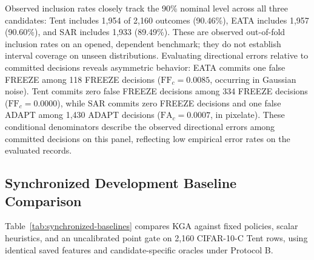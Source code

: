 Observed inclusion rates closely track the 90\% nominal level across all three candidates:
Tent includes 1,954 of 2,160 outcomes (90.46\%), EATA includes 1,957 (90.60\%), and SAR includes 1,933 (89.49\%).
These are observed out-of-fold inclusion rates on an opened, dependent benchmark; they do not establish interval coverage on unseen distributions.
Evaluating directional errors relative to committed decisions reveals asymmetric behavior:
EATA commits one false FREEZE among 118 FREEZE decisions ($\mathrm{FF}_c = 0.0085$, occurring in Gaussian noise).
Tent commits zero false FREEZE decisions among 334 FREEZE decisions ($\mathrm{FF}_c = 0.0000$), while SAR commits
zero FREEZE decisions and one false ADAPT among 1,430 ADAPT decisions ($\mathrm{FA}_c = 0.0007$, in pixelate).
These conditional denominators describe the observed directional errors among committed decisions
on this panel, reflecting low empirical error rates on the evaluated records.

\subsection{Synchronized Development Baseline Comparison}
\label{sec:synchronized-baselines}

Table~\ref{tab:synchronized-baselines} compares KGA against fixed policies, scalar heuristics, and an uncalibrated
point gate on 2,160 CIFAR-10-C Tent rows, using identical saved features and candidate-specific oracles under Protocol B.

\begin{table}[t]
\centering
\small
\caption{Current outcome-disjoint saved-feature comparison on 2,160 CIFAR-10-C
Tent rows, computed from the same paired scores. All rows
have the same oracle and weights; both fitted gates use identical predictions.
Lower regret is better. $\mathrm{FA}_{\mathrm u}$ is the fraction of all rows
with ADAPT and $B\le0$; commitment is $(A+F)/n$.}
\label{tab:synchronized-baselines}
\resizebox{\textwidth}{!}{}
\end{table}

